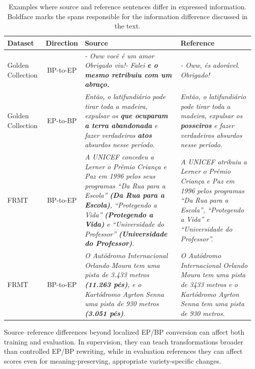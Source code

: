 \begin{table}[H]
\centering
\thesistablefont
\setlength{\tabcolsep}{4pt}
\caption{Examples where source and reference sentences differ in expressed information. Boldface marks the spans responsible for the information difference discussed in the text.}
\label{tab:dataset-information-mismatch}
\begin{tabularx}{\textwidth}{@{}lcYY@{}}
\toprule
Dataset & Direction & Source & Reference \\
\midrule
Golden Collection &
BP-to-EP &
\textit{- Oww voc\^e \'e um amor Obrigado viu!- Falei \textbf{e o mesmo retribuiu com um abra\c{c}o.}} &
\textit{- Oww, \'es ador\'avel. Obrigado!} \\

Golden Collection &
EP-to-BP &
\textit{Ent\~ao, o latifundi\'ario pode tirar toda a madeira, expulsar os \textbf{que ocuparam a terra abandonada} e fazer verdadeiros \textbf{atos} absurdos nesse per\'iodo.} &
\textit{Ent\~ao, o latifundi\'ario pode tirar toda a madeira, expulsar os \textbf{posseiros} e fazer verdadeiros absurdos nesse per\'iodo.} \\

FRMT &
BP-to-EP &
\textit{A UNICEF concedeu a Lerner o Pr\^emio Crian\c{c}a e Paz em 1996 pelos seus programas ``Da Rua para a Escola'' \textbf{(Da Rua para a Escola)}, ``Protegendo a Vida'' \textbf{(Protegendo a Vida)} e ``Universidade do Professor'' \textbf{(Universidade do Professor)}.} &
\textit{A UNICEF atribuiu a Lerner o Pr\'emio Crian\c{c}a e Paz em 1996 pelos programas ``Da Rua para a Escola'', ``Protegendo a Vida'' e ``Universidade do Professor''.} \\

FRMT &
BP-to-EP &
\textit{O Aut\'odromo Internacional Orlando Moura tem uma pista de 3.433 metros \textbf{(11.263 p\'es)}, e o Kart\'odromo Ayrton Senna uma pista de 930 metros \textbf{(3.051 p\'es)}.} &
\textit{O Aut\'odromo Internacional Orlando Moura tem uma pista de 3433 metros e o Kart\'odromo Ayrton Senna tem uma pista de 930 metros.} \\
\bottomrule
\end{tabularx}
\end{table}

Source–reference differences beyond localized EP/BP conversion can affect both
training and evaluation. In supervision, they can teach transformations broader
than controlled EP/BP rewriting, while in evaluation references they can affect
scores even for meaning-preserving, appropriate variety-specific changes.

